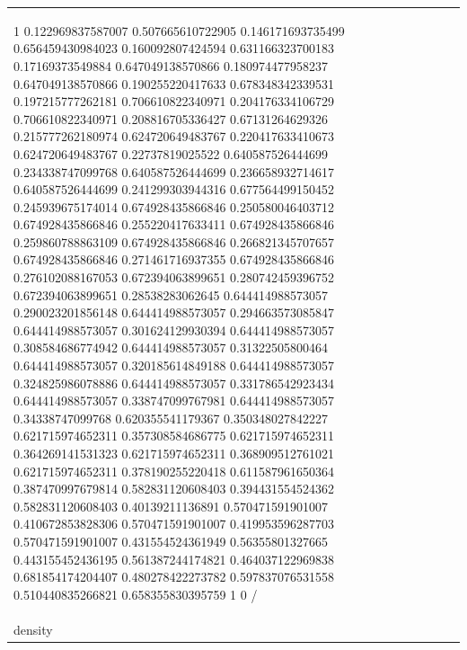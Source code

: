 \documentclass[runningheads]{llncs}\usepackage[]{graphicx}\usepackage[]{color}
\renewcommand{\sparklineheight}{2}
\begin{document}
\begin{table}[ht]
\begin{tabular}{l|p{2.2cm}p{2.2cm}p{2.2cm}p{2.2cm}}
{\begin{sparkline}{10}
\spark 0 1 0.122969837587007 0.507665610722905 0.146171693735499 0.656459430984023 0.160092807424594 0.631166323700183 0.17169373549884 0.647049138570866 0.180974477958237 0.647049138570866 0.190255220417633 0.678348342339531 0.197215777262181 0.706610822340971 0.204176334106729 0.706610822340971 0.208816705336427 0.67131264629326 0.215777262180974 0.624720649483767 0.220417633410673 0.624720649483767 0.22737819025522 0.640587526444699 0.234338747099768 0.640587526444699 0.236658932714617 0.640587526444699 0.241299303944316 0.677564499150452 0.245939675174014 0.674928435866846 0.250580046403712 0.674928435866846 0.255220417633411 0.674928435866846 0.259860788863109 0.674928435866846 0.266821345707657 0.674928435866846 0.271461716937355 0.674928435866846 0.276102088167053 0.672394063899651 0.280742459396752 0.672394063899651 0.28538283062645 0.644414988573057 0.290023201856148 0.644414988573057 0.294663573085847 0.644414988573057 0.301624129930394 0.644414988573057 0.308584686774942 0.644414988573057 0.31322505800464 0.644414988573057 0.320185614849188 0.644414988573057 0.324825986078886 0.644414988573057 0.331786542923434 0.644414988573057 0.338747099767981 0.644414988573057 0.34338747099768 0.620355541179367 0.350348027842227 0.621715974652311 0.357308584686775 0.621715974652311 0.364269141531323 0.621715974652311 0.368909512761021 0.621715974652311 0.378190255220418 0.611587961650364 0.387470997679814 0.582831120608403 0.394431554524362 0.582831120608403 0.40139211136891 0.570471591901007 0.410672853828306 0.570471591901007 0.419953596287703 0.570471591901007 0.431554524361949 0.56355801327665 0.443155452436195 0.561387244174821 0.464037122969838 0.681854174204407 0.480278422273782 0.597837076531558 0.510440835266821 0.658355830395759 1 0 /
\end{sparkline}} &  \\ 
  density & {\renewcommand{\sparklineheight}{3}\definecolor{sparklinecolor}{named}{black}\begin{sparkline}{10}

\end{sparkline}}
\end{tabular}
\end{table}
\end{document}
